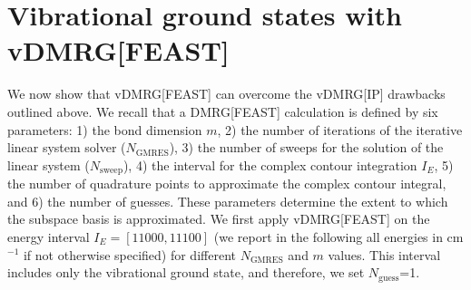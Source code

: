 \documentclass[journal=jctcce]{achemso}
\begin{document}
\section{Vibrational ground states with vDMRG[FEAST]}

\noindent We now show that vDMRG[FEAST] can overcome the vDMRG[IP] drawbacks outlined above.
We recall that a DMRG[FEAST] calculation is defined by six parameters: 1) the bond dimension $m$, 2) the number of iterations of the iterative linear system solver ($N_\text{GMRES}$), 3) the number of sweeps for the solution of the linear system ($N_\text{sweep}$), 4) the interval for the complex contour integration $I_E$, 5) the number of quadrature points to approximate the complex contour integral, and 6) the number of guesses.
These parameters determine the extent to which the subspace basis is approximated. 
We first apply vDMRG[FEAST] on the energy interval $I_E=[11000, 11100]$ (we report in the following all energies in cm$^{-1}$ if not otherwise specified) for different $N_\text{GMRES}$ and $m$ values.
This interval includes only the vibrational ground state, and therefore, we set $N_\text{guess}$=1.
\end{document}

